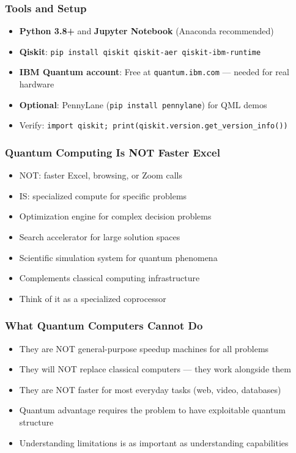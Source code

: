 \begin{frame}[fragile]\frametitle{Tools and Setup}
\begin{itemize}
\item \textbf{Python 3.8+} and \textbf{Jupyter Notebook} (Anaconda recommended)
\item \textbf{Qiskit}: \texttt{pip install qiskit qiskit-aer qiskit-ibm-runtime}
\item \textbf{IBM Quantum account}: Free at \texttt{quantum.ibm.com} --- needed for real hardware
\item \textbf{Optional}: PennyLane (\texttt{pip install pennylane}) for QML demos
\item Verify: \texttt{import qiskit; print(qiskit.version.get\_version\_info())}
\end{itemize}
\end{frame}

\begin{frame}[fragile]\frametitle{Quantum Computing Is NOT Faster Excel}
\begin{itemize}
\item NOT: faster Excel, browsing, or Zoom calls
\item IS: specialized compute for specific problems
\item Optimization engine for complex decision problems
\item Search accelerator for large solution spaces
\item Scientific simulation system for quantum phenomena
\item Complements classical computing infrastructure
\item Think of it as a specialized coprocessor
\end{itemize}
\end{frame}

\begin{frame}[fragile]\frametitle{What Quantum Computers Cannot Do}
\begin{itemize}
\item They are NOT general-purpose speedup machines for all problems
\item They will NOT replace classical computers --- they work alongside them
\item They are NOT faster for most everyday tasks (web, video, databases)
\item Quantum advantage requires the problem to have exploitable quantum structure
\item Understanding limitations is as important as understanding capabilities
\end{itemize}
\end{frame}


